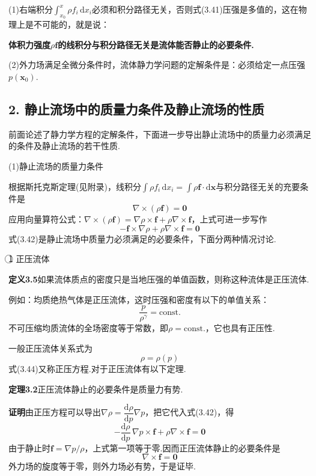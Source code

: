 (1)右端积分$\displaystyle\int_{x_0}^{x}\rho f_i\,\mathrm{d}x_i$必须和积分路径无关，否则式(3.41)压强是多值的，这在物理上是不可能的，就是说：

\textbf{体积力强度$\rho\boldsymbol{f}$的线积分与积分路径无关是流体能否静止的必要条件.}

(2)外力场满足全微分条件时，流体静力学问题的定解条件是：必须给定一点压强$p(\boldsymbol{x}_0)$.

\subsection*{2. 静止流场中的质量力条件及静止流场的性质}

前面论述了静力学方程的定解条件，下面进一步导出静止流场中的质量力必须满足的条件及静止流场的若干性质.

(1)静止流场的质量力条件

根据斯托克斯定理(见附录)，线积分$\displaystyle\int\rho f_i\,\mathrm{d}x_i=\int\rho\boldsymbol{f}\cdot\mathrm{d}\boldsymbol{x}$与积分路径无关的充要条件是
\[
\nabla\times(\rho\boldsymbol{f})=\boldsymbol{0}
\]
应用向量算符公式：$\nabla\times(\rho\boldsymbol{f})=\nabla\rho\times\boldsymbol{f}+\rho\nabla\times\boldsymbol{f}$，上式可进一步写作
\begin{equation*}
-\boldsymbol{f}\times\nabla\rho+\rho\nabla\times\boldsymbol{f}=\boldsymbol{0}
\tag{3.42}
\end{equation*}
式(3.42)是静止流场中质量力必须满足的必要条件，下面分两种情况讨论.

\textcircled{1} 正压流体

\noindent\textbf{定义3.5}\quad 如果流体质点的密度只是当地压强的单值函数，则称这种流体是正压流体.

例如：均质绝热气体是正压流体，这时压强和密度有以下的单值关系：
\begin{equation*}
\frac{p}{\rho^{\gamma}}=\mathrm{const.}
\tag{3.43}
\end{equation*}
不可压缩均质流体的全场密度等于常数，即$\rho=\mathrm{const.}$，它也具有正压性.

一般正压流体关系式为
\begin{equation*}
\rho=\rho(p)
\tag{3.44}
\end{equation*}
式(3.44)又称正压方程.对于正压流体有以下定理.

\noindent\textbf{定理3.2}\quad 正压流体静止的必要条件是质量力有势.

\noindent\textbf{证明}\quad 由正压方程可以导出$\nabla\rho=\dfrac{\mathrm{d}\rho}{\mathrm{d}p}\nabla p$，把它代入式(3.42)，得
\[
-\frac{\mathrm{d}\rho}{\mathrm{d}p}\,\nabla p\times\boldsymbol{f}+\rho\nabla\times\boldsymbol{f}=\boldsymbol{0}
\]
由于静止时$\boldsymbol{f}=\nabla p/\rho$，上式第一项等于零.因而正压流体静止的必要条件是
\begin{equation*}
\nabla\times\boldsymbol{f}=\boldsymbol{0}
\tag{3.45}
\end{equation*}
外力场的旋度等于零，则外力场必有势，于是证毕.

